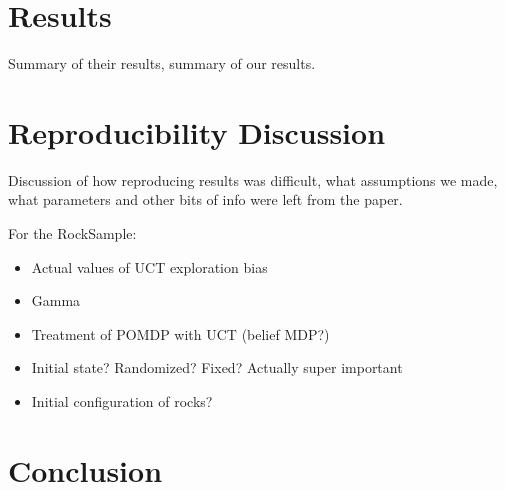 \documentclass[11pt]{article} %
\begin{document}
\section{Results}

Summary of their results, summary of our results.


\section{Reproducibility Discussion}

Discussion of how reproducing results was difficult, what assumptions we made, what parameters and other bits of info were left from the paper.

For the RockSample:
\begin{itemize}
\item Actual values of UCT exploration bias
\item Gamma
\item Treatment of POMDP with UCT (belief MDP?)
\item Initial state? Randomized? Fixed? Actually super important
\item Initial configuration of rocks?
\end{itemize}


\section{Conclusion}




\end{document}

